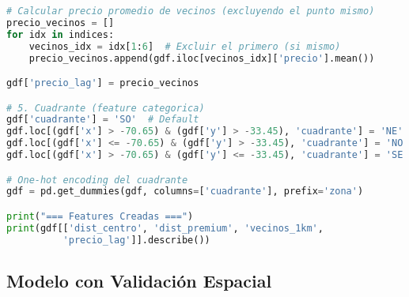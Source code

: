 \documentclass[11pt,a4paper]{article}
\begin{document}
\begin{lstlisting}[language=Python]
# Calcular precio promedio de vecinos (excluyendo el punto mismo)
precio_vecinos = []
for idx in indices:
    vecinos_idx = idx[1:6]  # Excluir el primero (si mismo)
    precio_vecinos.append(gdf.iloc[vecinos_idx]['precio'].mean())

gdf['precio_lag'] = precio_vecinos

# 5. Cuadrante (feature categorica)
gdf['cuadrante'] = 'SO'  # Default
gdf.loc[(gdf['x'] > -70.65) & (gdf['y'] > -33.45), 'cuadrante'] = 'NE'
gdf.loc[(gdf['x'] <= -70.65) & (gdf['y'] > -33.45), 'cuadrante'] = 'NO'
gdf.loc[(gdf['x'] > -70.65) & (gdf['y'] <= -33.45), 'cuadrante'] = 'SE'

# One-hot encoding del cuadrante
gdf = pd.get_dummies(gdf, columns=['cuadrante'], prefix='zona')

print("=== Features Creadas ===")
print(gdf[['dist_centro', 'dist_premium', 'vecinos_1km', 
          'precio_lag']].describe())
\end{lstlisting}

\subsection{Modelo con Validación Espacial}
\end{document}
